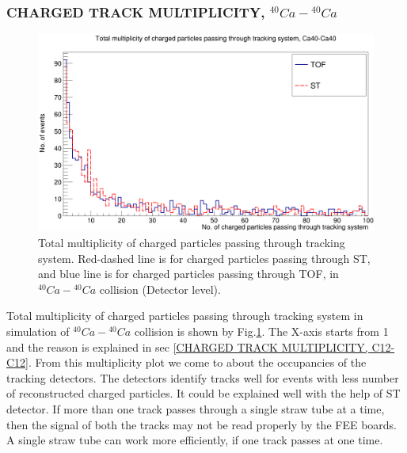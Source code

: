 \documentclass[12pt, twocolumn]{article}
\begin{document}
\subsubsection{CHARGED TRACK MULTIPLICITY, $^{40}Ca-{^{40}Ca}$}
\begin{figure}[h]
\centering
\includegraphics[scale=0.14]{Detector_TotalMultiplicity_Ca40.png}
\caption{Total multiplicity of charged particles passing through tracking system. Red-dashed line is for charged particles passing through ST, and blue line is for charged particles passing through TOF, in $^{40}Ca-{^{40}Ca}$ collision (Detector level).}
\label{Total multiplicity of charged particles passing through tracking system. Red-dashed line is for charged particles passing through ST, and blue line is for charged particles passing through TOF, in Ca40-Ca40 collision (Detector stage).}
\end{figure}
Total multiplicity of charged particles passing through tracking system in simulation of $^{40}Ca-{^{40}Ca}$ collision is shown by Fig.\ref{Total multiplicity of charged particles passing through tracking system. Red-dashed line is for charged particles passing through ST, and blue line is for charged particles passing through TOF, in Ca40-Ca40 collision (Detector stage).}. The X-axis starts from 1 and the reason is explained in sec \ref{CHARGED TRACK MULTIPLICITY, C12-C12}. From this multiplicity plot we come to about the occupancies of the tracking detectors. The detectors identify tracks well for events with less number of reconstructed charged particles. It could be explained well with the help of ST detector. If more than one track passes through a single straw tube at a time, then the signal of both the tracks may not be read properly by the FEE boards. A single straw tube can work more efficiently, if one track passes at one time.
\end{document}
